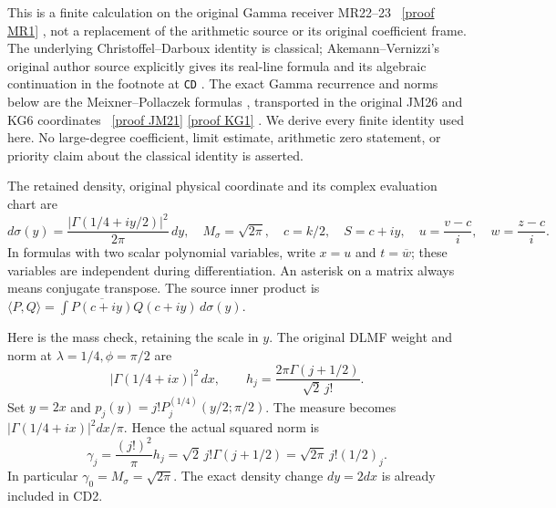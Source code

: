 \documentclass[11pt]{article}
\begin{document}
This is a finite calculation on the original Gamma receiver MR22--23
\cite{cdroot:MR}%
~\href{https://github.com/KokunoYumeto/zeta-function-research-reader/blob/5992ad50c0f2a06921f1fcaded7b4e38097c0739/workbenches/splitzero-tandem/continuations/20260920-original-kernel-mixed-determinants/ORIGINAL_KERNEL_MIXED_DETERMINANT.tex\#L36}{[proof MR1]}%
{}, not a replacement of the arithmetic source or its original
coefficient frame. The underlying Christoffel--Darboux identity is
classical; Akemann--Vernizzi's original author source explicitly gives
its real-line formula and its algebraic continuation in the footnote
at \texttt{CD} \cite{cdroot:AV}. The exact Gamma recurrence and norms below
are the Meixner--Pollaczek formulas \cite{cdroot:DLMF}, transported in the
original JM26 and KG6 coordinates \cite{cdroot:JM,cdroot:KG}%
~\href{https://github.com/KokunoYumeto/zeta-function-research-reader/blob/5992ad50c0f2a06921f1fcaded7b4e38097c0739/workbenches/splitzero-tandem/continuations/20260920-original-kernel-mixed-determinants/providers/JOINT_MINIMUM_RECEIVERS.tex\#L286}{[proof JM21]} \href{https://github.com/KokunoYumeto/zeta-function-research-reader/blob/5992ad50c0f2a06921f1fcaded7b4e38097c0739/workbenches/splitzero-tandem/continuations/20260920-original-kernel-mixed-determinants/providers/KERNEL_GAMMA_INDEPENDENT.tex\#L73}{[proof KG1]}%
{}. We derive every finite
identity used here. No large-degree coefficient, limit estimate,
arithmetic zero statement, or priority claim about the classical
identity is asserted.

The retained density, original physical coordinate and its complex
evaluation chart are
\begin{equation}\label{cdroot:eq:source}
 d\sigma(y)=\frac{|\Gamma(1/4+iy/2)|^2}{2\pi}\,dy,
 \quad M_\sigma=\sqrt{2\pi},\quad c=k/2,
 \quad S=c+iy,
 \quad u=\frac{v-c}{i},\quad w=\frac{z-c}{i}.
 \tag{CD1}
\end{equation}
In formulas with two scalar polynomial variables, write \(x=u\) and
\(t=\overline w\); these variables are independent during
differentiation. An asterisk on a matrix always means conjugate
transpose. The source inner product is
\(\langle P,Q\rangle=\int\overline{P(c+iy)}Q(c+iy)\,d\sigma(y)\).

Here is the mass check, retaining the scale in \(y\). The original DLMF
weight and norm at \(\lambda=1/4,\phi=\pi/2\) are
\[
 |\Gamma(1/4+ix)|^2\,dx,
 \qquad
 h_j=\frac{2\pi\Gamma(j+1/2)}{\sqrt2\,j!}.
\]
Set \(y=2x\) and
\(p_j(y)=j!P_j^{(1/4)}(y/2;\pi/2)\).
The measure becomes \(|\Gamma(1/4+ix)|^2dx/\pi\). Hence the actual
squared norm is
\begin{equation}\label{cdroot:eq:norm}
 \gamma_j=\frac{(j!)^2}{\pi}h_j
 =\sqrt2\,j!\Gamma(j+1/2)
 =\sqrt{2\pi}\,j!(1/2)_j.
 \tag{CD2}
\end{equation}
In particular \(\gamma_0=M_\sigma=\sqrt{2\pi}\). The exact density
change \(dy=2dx\) is already included in CD2.
\end{document}

